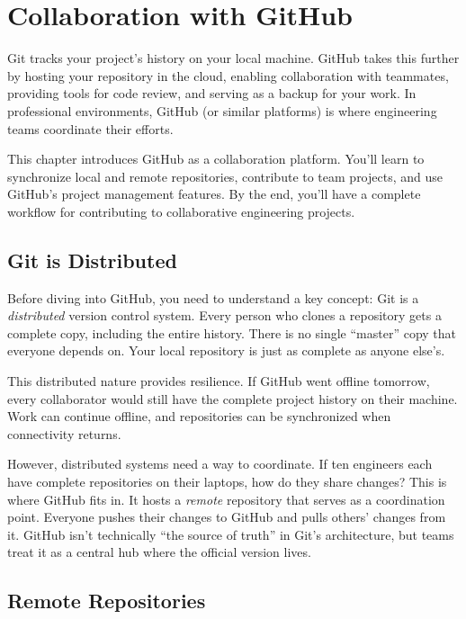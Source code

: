 \documentclass[
  letterpaper,
  DIV=11,
  numbers=noendperiod]{scrreprt}
\begin{document}
\chapter{Collaboration with GitHub}\label{sec-github}

Git tracks your project's history on your local machine. GitHub takes
this further by hosting your repository in the cloud, enabling
collaboration with teammates, providing tools for code review, and
serving as a backup for your work. In professional environments, GitHub
(or similar platforms) is where engineering teams coordinate their
efforts.

This chapter introduces GitHub as a collaboration platform. You'll learn
to synchronize local and remote repositories, contribute to team
projects, and use GitHub's project management features. By the end,
you'll have a complete workflow for contributing to collaborative
engineering projects.

\section{Git is Distributed}\label{git-is-distributed}

Before diving into GitHub, you need to understand a key concept: Git is
a \emph{distributed} version control system. Every person who clones a
repository gets a complete copy, including the entire history. There is
no single ``master'' copy that everyone depends on. Your local
repository is just as complete as anyone else's.

This distributed nature provides resilience. If GitHub went offline
tomorrow, every collaborator would still have the complete project
history on their machine. Work can continue offline, and repositories
can be synchronized when connectivity returns.

However, distributed systems need a way to coordinate. If ten engineers
each have complete repositories on their laptops, how do they share
changes? This is where GitHub fits in. It hosts a \emph{remote}
repository that serves as a coordination point. Everyone pushes their
changes to GitHub and pulls others' changes from it. GitHub isn't
technically ``the source of truth'' in Git's architecture, but teams
treat it as a central hub where the official version lives.

\section{Remote Repositories}\label{remote-repositories}
\end{document}
